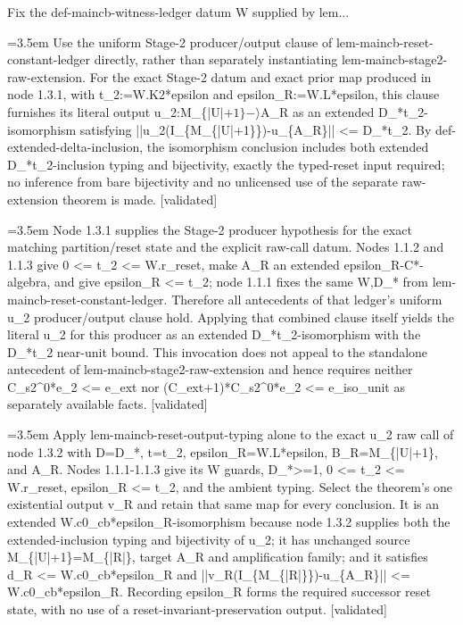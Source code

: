 \documentclass{article}
\newcommand{\step}[1]{\par\noindent\hangindent=3.5em\hangafter=1%
  \makebox[3.5em][l]{\textbf{#1.}}}
\newcommand{\steptag}[1]{\hfill{\small\textsf{[#1]}}}
\begin{document}
\begin{proofbox}{Fix the def-maincb-witness-ledger datum W supplied by lem...}
\step{1.3.2} Use the uniform Stage-2 producer/output clause of lem-maincb-reset-constant-ledger directly, rather than separately instantiating lem-maincb-stage2-raw-extension. For the exact Stage-2 datum and exact prior map produced in node 1.3.1, with t\_2:=W.K2*epsilon and epsilon\_R:=W.L*epsilon, this clause furnishes its literal output u\_2:M\_\{|U$|+1\}-\rangle$A\_R as an extended D\_*t\_2-isomorphism satisfying ||u\_2(I\_\{M\_\{|U|+1\}\})-u\_\{A\_R\}|| <= D\_*t\_2. By def-extended-delta-inclusion, the isomorphism conclusion includes both extended D\_*t\_2-inclusion typing and bijectivity, exactly the typed-reset input required; no inference from bare bijectivity and no unlicensed use of the separate raw-extension theorem is made. \steptag{validated} \\[6pt]
\step{1.3.2.1} Node 1.3.1 supplies the Stage-2 producer hypothesis for the exact matching partition/reset state and the explicit raw-call datum. Nodes 1.1.2 and 1.1.3 give 0 <= t\_2 <= W.r\_reset, make A\_R an extended epsilon\_R-C*-algebra, and give epsilon\_R <= t\_2; node 1.1.1 fixes the same W,D\_* from lem-maincb-reset-constant-ledger. Therefore all antecedents of that ledger's uniform u\_2 producer/output clause hold. Applying that combined clause itself yields the literal u\_2 for this producer as an extended D\_*t\_2-isomorphism with the D\_*t\_2 near-unit bound. This invocation does not appeal to the standalone antecedent of lem-maincb-stage2-raw-extension and hence requires neither C\_s2\textasciicircum{}0*e\_2 <= e\_ext nor (C\_ext+1)*C\_s2\textasciicircum{}0*e\_2 <= e\_iso\_unit as separately available facts. \steptag{validated} \\[4pt]
\step{1.3.3} Apply lem-maincb-reset-output-typing alone to the exact u\_2 raw call of node 1.3.2 with D=D\_*, t=t\_2, epsilon\_R=W.L*epsilon, B\_R=M\_\{|U|+1\}, and A\_R. Nodes 1.1.1-1.1.3 give its W guards, D\_*>=1, 0 <= t\_2 <= W.r\_reset, epsilon\_R <= t\_2, and the ambient typing. Select the theorem's one existential output v\_R and retain that same map for every conclusion. It is an extended W.c0\_cb*epsilon\_R-isomorphism because node 1.3.2 supplies both the extended-inclusion typing and bijectivity of u\_2; it has unchanged source M\_\{|U|+1\}=M\_\{|R|\}, target A\_R and amplification family; and it satisfies d\_R <= W.c0\_cb*epsilon\_R and ||v\_R(I\_\{M\_\{|R|\}\})-u\_\{A\_R\}|| <= W.c0\_cb*epsilon\_R. Recording epsilon\_R forms the required successor reset state, with no use of a reset-invariant-preservation output. \steptag{validated} \\[4pt]

\end{proofbox}
\end{document}
